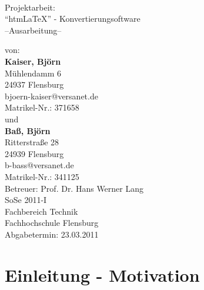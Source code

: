 \documentclass[	a4paper,		%
		titlepage, 		%
		fontsize=12pt		%
		]{scrartcl} 		%
\begin{document}
\begin{titlepage}
\centering
\resizebox*{.25\textheight}{!}{} \\
\vspace{1cm}
\Large Projektarbeit: \\ ``htm\LaTeX'' - Konvertierungsoftware\\ --Ausarbeitung--
\vspace{2cm}
\vfill
\begin{flushleft}			%
\noindent
\normalsize
von:\\ \textbf{Kaiser, Björn} \\Mühlendamm 6\\24937 Flensburg\\bjoern-kaiser@versanet.de\\ Matrikel-Nr.: 371658\\ \vspace{.5cm}
und\\ \vspace{.5cm}
\textbf{Baß, Björn} \\Ritterstraße 28\\24939 Flensburg\\b-bass@versanet.de\\ Matrikel-Nr.: 341125\\ \vspace{1cm}
\large Betreuer: Prof. Dr. Hans Werner Lang\\
SoSe 2011-I\\
Fachbereich Technik\\
Fachhochschule Flensburg\\\vspace{.5em}
Abgabetermin: 23.03.2011
\end{flushleft}
\end{titlepage}

\newpage				%
\tableofcontents			%
\thispagestyle{empty}			%
\newpage				%

\section{Einleitung - Motivation}
\end{document}
